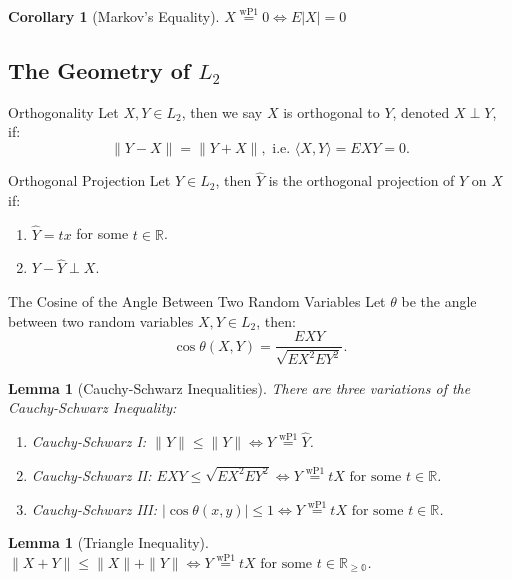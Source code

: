 \documentclass[11pt]{article}
\makeatletter
\newenvironment{definition}[1]{\begin{defbox}{#1}{}}{\end{defbox}}
\theoremstyle{quiet}
\newtheorem{lemma}[tcb@cnt@defbox]{Lemma}
\newtheorem{corollary}[tcb@cnt@defbox]{Corollary}
\theoremstyle{quietremark}
\newcommand{\1}{\mathbf{1}}            %
\makeatother
\begin{document}
\begin{corollary}[Markov's Equality]
$X \overset{\text{wP1}}{=} 0\iff E|X|=0$
\end{corollary}

\subsection{The Geometry of $L_2$}
\begin{definition}{Orthogonality}
Let $X,Y\in L_2$, then we say $X$ is orthogonal to $Y$, denoted $X\perp Y$, if: 
\[
\|Y-X\|=\|Y+X\|, \text{ i.e. }\langle X,Y\rangle=EXY=0.
\]
\end{definition}

\begin{definition}{Orthogonal Projection}
Let $Y\in L_2$, then $\widehat Y$ is the orthogonal projection of $Y$ on $X$ if:
\begin{enumerate}
\item $\widehat Y=tx$ for some $t\in\mathbb{R}$.
\item $Y-\widehat Y\perp X$.
\end{enumerate}
\end{definition}

\begin{definition}{The Cosine of the Angle Between Two Random Variables}
Let $\theta$ be the angle between two random variables $X,Y\in L_2$, then:
\[
\cos\theta(X,Y)=\frac{EXY}{\sqrt{EX^2EY^2}}.
\]
\end{definition}
\begin{lemma}[Cauchy-Schwarz Inequalities]
There are three variations of the Cauchy-Schwarz Inequality:
\begin{enumerate}
\item Cauchy-Schwarz I: $\|\widehat Y\|\le\|Y\|\iff Y\overset{\text{wP1}}{=}\widehat Y $.
\item Cauchy-Schwarz II: $EXY\le\sqrt{EX^2EY^2} \iff Y\overset{\text{wP1}}{=}tX\text{ for some }t\in\mathbb{R}$.
\item Cauchy-Schwarz III: $|\cos\theta(x,y)|\le 1\iff Y\overset{\text{wP1}}{=}tX\text{ for some }t\in \mathbb{R}$.
\end{enumerate}
\end{lemma}

\begin{lemma}[Triangle Inequality]
$\|X+Y\|\le\|X\|+\|Y\| \iff Y\overset{\text{wP1}}{=}tX\text{ for some }t\in \mathbb{R_{\ge 0}}$.
\end{lemma}
\end{document}
